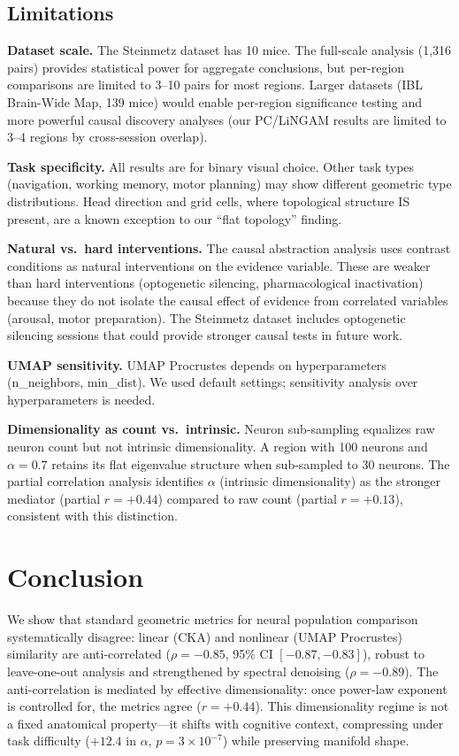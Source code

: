 \documentclass{article}
\begin{document}
\subsection{Limitations}

\textbf{Dataset scale.} The Steinmetz dataset has 10 mice. The full-scale analysis (1,316 pairs) provides statistical power for aggregate conclusions, but per-region comparisons are limited to 3--10 pairs for most regions. Larger datasets (IBL Brain-Wide Map, 139 mice) would enable per-region significance testing and more powerful causal discovery analyses (our PC/LiNGAM results are limited to 3--4 regions by cross-session overlap).

\textbf{Task specificity.} All results are for binary visual choice. Other task types (navigation, working memory, motor planning) may show different geometric type distributions. Head direction and grid cells, where topological structure IS present, are a known exception to our ``flat topology'' finding.

\textbf{Natural vs.\ hard interventions.} The causal abstraction analysis uses contrast conditions as natural interventions on the evidence variable. These are weaker than hard interventions (optogenetic silencing, pharmacological inactivation) because they do not isolate the causal effect of evidence from correlated variables (arousal, motor preparation). The Steinmetz dataset includes optogenetic silencing sessions that could provide stronger causal tests in future work.

\textbf{UMAP sensitivity.} UMAP Procrustes depends on hyperparameters (n\_neighbors, min\_dist). We used default settings; sensitivity analysis over hyperparameters is needed.

\textbf{Dimensionality as count vs.\ intrinsic.} Neuron sub-sampling equalizes raw neuron count but not intrinsic dimensionality. A region with 100 neurons and $\alpha = 0.7$ retains its flat eigenvalue structure when sub-sampled to 30 neurons. The partial correlation analysis identifies $\alpha$ (intrinsic dimensionality) as the stronger mediator (partial $r = +0.44$) compared to raw count (partial $r = +0.13$), consistent with this distinction.

\section{Conclusion}

We show that standard geometric metrics for neural population comparison systematically disagree: linear (CKA) and nonlinear (UMAP Procrustes) similarity are anti-correlated ($\rho = -0.85$, 95\% CI $[-0.87, -0.83]$), robust to leave-one-out analysis and strengthened by spectral denoising ($\rho = -0.89$). The anti-correlation is mediated by effective dimensionality: once power-law exponent is controlled for, the metrics agree ($r = +0.44$). This dimensionality regime is not a fixed anatomical property---it shifts with cognitive context, compressing under task difficulty ($+12.4$ in $\alpha$, $p = 3 \times 10^{-7}$) while preserving manifold shape.
\end{document}
